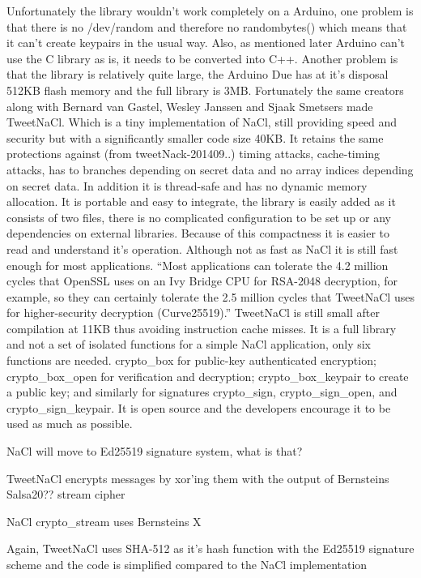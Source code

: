 Unfortunately the library wouldn't work completely on a Arduino, one problem is that there is no /dev/random and therefore no randombytes() which means that it can't create keypairs in the usual way.
Also, as mentioned later Arduino can't use the C library as is, it needs to be converted into C++. 
Another problem is that the library is relatively quite large, the Arduino Due has at it's disposal 512KB flash memory and the full library is 3MB. Fortunately the same creators along with Bernard van Gastel, Wesley Janssen and Sjaak Smetsers made TweetNaCl. Which is a tiny implementation of NaCl, still providing speed and security but with a significantly smaller code size 40KB. It retains the same protections against (from tweetNack-201409..) timing attacks, cache-timing attacks, has to branches depending on secret data and no array indices depending on secret data. In addition it is thread-safe and has no dynamic memory allocation. It is portable and easy to integrate, the library is easily added as it consists of two files, there is no complicated configuration to be set up or any dependencies on external libraries. Because of this compactness it is easier to read and understand it's operation. Although not as fast as NaCl it is still fast enough for most applications. ``Most applications can tolerate the 4.2 million cycles that OpenSSL uses
on an Ivy Bridge CPU for RSA-2048 decryption, for example, so they can certainly tolerate
the 2.5 million cycles that TweetNaCl uses for higher-security decryption (Curve25519).''
TweetNaCl is still small after compilation at 11KB thus avoiding instruction cache misses. It is a full library and not a set of isolated functions for a simple NaCl application, only six functions are needed. crypto\_box for public-key authenticated encryption; crypto\_box\_open for verification and decryption; crypto\_box\_keypair to create a public key; and similarly for signatures crypto\_sign, crypto\_sign\_open, and crypto\_sign\_keypair. It is open source and the developers encourage it to be used as much as possible. 



NaCl will move to Ed25519 signature system, what is that?

TweetNaCl encrypts messages by xor'ing them with the output of Bernsteins Salsa20?? stream cipher

NaCl crypto\_stream uses Bernsteins X

Again, TweetNaCl uses SHA-512 as it's hash function with the Ed25519 signature scheme and the code is simplified compared to the NaCl implementation

